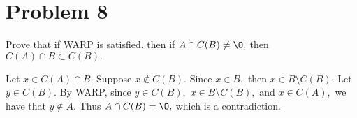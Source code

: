 \documentclass[11pt]{article}
\renewcommand{\emptyset}{\O}
\newcommand{\sm}{\setminus}
\begin{document}
\newpage
\section*{Problem 8}
\begin{problem}
    Prove that if WARP is satisfied, then if $A \cap C(B)\neq \emptyset,$ then $C(A)\cap B \subset C(B).$  
\end{problem}
\begin{solution}
    Let $x\in C(A)\cap B.$ Suppose $x\notin C(B).$ Since $x\in B,$ then $x\in B\sm C(B).$ Let $y\in C(B).$ By WARP, since $y\in C(B),$ $x\in B\sm C(B),$ and $x\in C(A),$ we have that $y\notin A.$ Thus $A\cap C(B) = \emptyset,$ which is a contradiction.
\end{solution}
\end{document}
